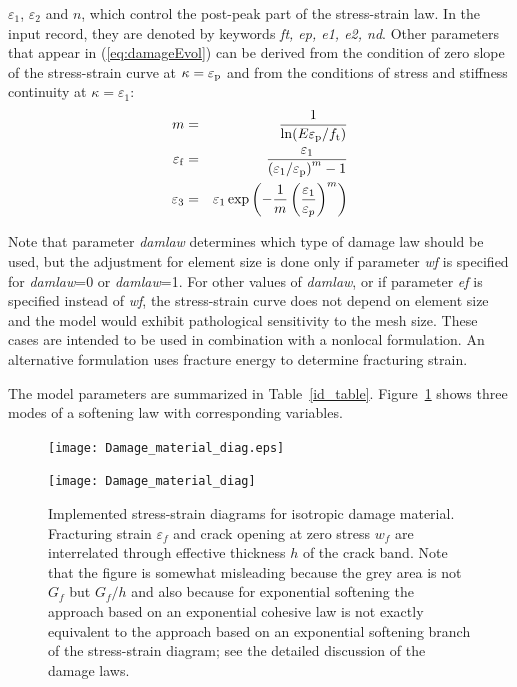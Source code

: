 \documentclass[a4paper]{article}
\newcommand{\param}[1]{{\it #1}}
\begin{document}
\begin{itemize}
$\varepsilon_1$, $\varepsilon_2$ and $n$, which control the post-peak part of the stress-strain law. In the input record, they are denoted by keywords
\param{ft, ep, e1, e2, nd}.
Other parameters that appear in (\ref{eq:damageEvol}) can be derived from the condition of zero
slope of the stress-strain curve at $\kappa=\varepsilon_{\rm p}$ and from the conditions of stress and
stiffness continuity at $\kappa=\varepsilon_1$:
\begin{eqnarray}\label{eqparams1}
m&=&\frac{1}{\ln(E\varepsilon_{\rm p}/f_{\rm t})}\\
\label{eqparams2}
\varepsilon_{\rm f}&=&\frac{\varepsilon_1}{\left(\varepsilon_1/\varepsilon_{\rm p}\right)^m -1}\\
\varepsilon_3&=&\varepsilon_1\exp\left(-\frac{1}{m}\left(\frac{\varepsilon_1}{\varepsilon_p}\right)^m\right)
\label{eqparams3}
\end{eqnarray}
\end{itemize} 

Note that parameter {\it damlaw} determines which type of damage law
should be used, but the adjustment for element size is done only if
parameter {\it wf} is specified for {\it damlaw}=0 or {\it damlaw}=1. 
For other values of {\it damlaw}, or if parameter {\it ef} 
is specified instead of {\it wf}, the stress-strain curve does not depend
on element size and the model would exhibit pathological sensitivity
to the mesh size. These cases are intended to be used in combination
with a nonlocal formulation. An alternative formulation uses fracture energy
to determine fracturing strain.

The model parameters are summarized in Table~\ref{id_table}. Figure~\ref{idm_softening} shows
three modes of a softening law with corresponding variables.

\begin{figure}[!htb]
\begin{htmlonly}
  \centerline{\texttt{[image: Damage\_material\_diag.eps]}}
\end{htmlonly}
 \centerline{\texttt{[image: Damage\_material\_diag]}}
  \caption{Implemented stress-strain diagrams for isotropic damage material. Fracturing strain $\varepsilon_f$ and crack opening at zero stress $w_f$ are interrelated through effective thickness $h$ of the crack band. Note that the
figure is somewhat misleading because the grey area is not $G_f$ but $G_f/h$ 
and also because for exponential softening the approach based on an exponential cohesive law is not exactly equivalent to the approach based on an exponential softening branch of the stress-strain diagram; see the detailed discussion of the damage laws.}
  \label{idm_softening}
\end{figure}
\end{document}
